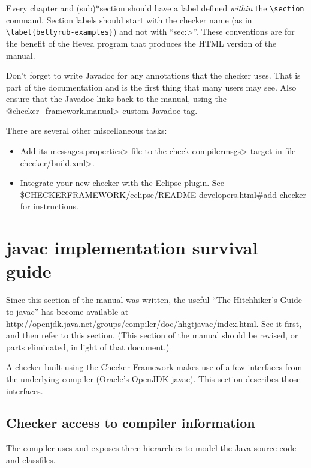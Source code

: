 Every chapter and (sub)*section should have a label defined \emph{within} the
\verb|\section| command.  Section labels should start with the checker
name (as in \verb|\label{bellyrub-examples}|) and not with ``\<sec:>''.
These conventions are for the benefit of the Hevea program that produces
the HTML version of the manual.

Don't forget to write Javadoc for any annotations that the checker uses.
That is part of the documentation and is the first thing that many users
may see.  Also ensure that the Javadoc links back to the manual, using the
\<@checker\_framework.manual> custom Javadoc tag.

There are several other miscellaneous tasks:
\begin{itemize}
\item
  Add its \<messages.properties> file to the \<check-compilermsgs> target in
  file \<checker/build.xml>.
\item
  Integrate your new checker with the Eclipse plugin.
  See \$CHECKERFRAMEWORK/eclipse/README-developers.html\#add-checker for instructions.
\end{itemize}


\section{javac implementation survival guide\label{javac-tips}}

Since this section of the manual was written, the useful ``The Hitchhiker's
Guide to javac'' has become available at
\url{http://openjdk.java.net/groups/compiler/doc/hhgtjavac/index.html}.
See it first, and then refer to this section.  (This section of the manual
should be revised, or parts eliminated, in light of that document.)


A checker built using the Checker Framework makes use of a few interfaces
from the underlying compiler (Oracle's OpenJDK javac).
This section describes those interfaces.




\subsection{Checker access to compiler information\label{compiler-information}}

The compiler uses and exposes three hierarchies to model the Java
source code and classfiles.


